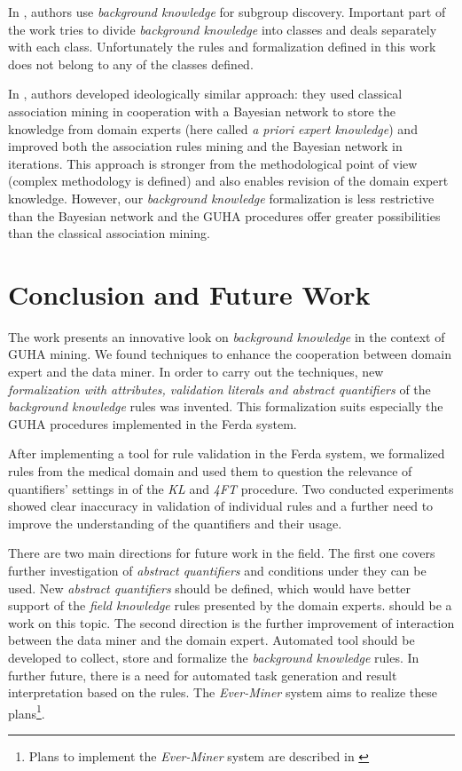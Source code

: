 \documentclass{llncs}
\begin{document}
In \cite{Puppe}, authors use \emph{background knowledge} for subgroup discovery.
Important part of the work tries to divide \emph{background knowledge} into classes and deals
separately with each class. Unfortunately the rules and formalization defined in
this work does not belong to any of the classes defined.

In \cite{Faure}, authors developed ideologically similar approach: they used
classical association mining in cooperation with a Bayesian network to store
the knowledge from domain experts (here called \emph{a priori expert knowledge})
and improved both the association rules mining and the Bayesian
network in iterations. This approach is stronger from the methodological point of view 
(complex methodology is defined) and also enables revision of the domain expert
knowledge. However, our \emph{background knowledge} formalization is less restrictive
than the Bayesian network and the GUHA procedures offer greater possibilities than
the classical association mining.

\section{Conclusion and Future Work}
\label{section:conclusion}

The work presents an innovative look on \emph{background knowledge} in the context
of GUHA mining. We found techniques to enhance the cooperation between domain expert
and the data miner. In order to carry out the techniques, new 
\emph{formalization with attributes, validation literals and abstract quantifiers}
of the \emph{background knowledge} rules was invented. This formalization suits
especially the GUHA procedures implemented in the Ferda system.

After implementing a tool for rule validation in the Ferda system, we formalized
rules from the medical domain and used them to question the relevance of quantifiers'
settings in of the \emph{KL} and \emph{4FT} procedure. Two conducted experiments
showed clear inaccuracy in validation of individual rules and a further need to
improve the understanding of the quantifiers and their usage. 

There are two main directions for future work in the field. The first one covers
further investigation of \emph{abstract quantifiers} and conditions under they
can be used. New \emph{abstract quantifiers} should be defined, which would have
better support of the \emph{field knowledge} rules presented by the domain experts.
\cite{Kupka} should be a work on this topic. The second direction is the further
improvement of interaction between the data miner and the domain expert. Automated
tool should be developed to collect, store and formalize the \emph{background
knowledge} rules. In further future, there is a need for automated task generation
and result interpretation based on the rules. The \emph{Ever-Miner} system 
aims to realize these plans\footnote{Plans to implement the \emph{Ever-Miner} system
are described in \cite{Diplomka}}. 
\end{document}
